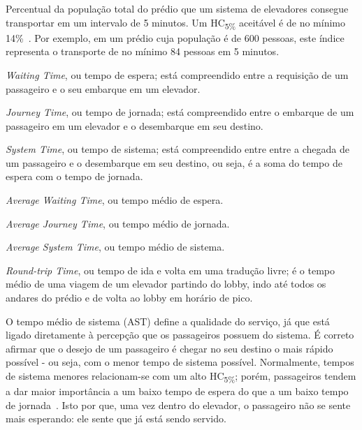 \begin{description}[leftmargin=!,labelwidth=\widthof{\bfseries HC\textsubscript{5\%}}]
  \item[HC\textsubscript{5\%}]
  Percentual da população total do prédio que um sistema de elevadores consegue transportar em um intervalo de 5 minutos. Um HC\textsubscript{5\%} aceitável é de no mínimo 14\%~\cite{KOEHLEROTTIGER02}. Por exemplo, em um prédio cuja população é de 600 pessoas, este índice representa o transporte de no mínimo 84 pessoas em 5 minutos.

  \item[WT]
  \textit{Waiting Time}, ou tempo de espera; está compreendido entre a requisição de um passageiro e o seu embarque em um elevador.

  \item[JT]
  \textit{Journey Time}, ou tempo de jornada; está compreendido entre o embarque de um passageiro em um elevador e o desembarque em seu destino.

  \item[ST]
  \textit{System Time}, ou tempo de sistema; está compreendido entre entre a chegada de um passageiro e o desembarque em seu destino, ou seja, é a soma do tempo de espera com o tempo de jornada.

  \item[AWT]
  \textit{Average Waiting Time}, ou tempo médio de espera.

  \item[AJT]
  \textit{Average Journey Time}, ou tempo médio de jornada.

  \item[AST]
  \textit{Average System Time}, ou tempo médio de sistema.

  \item[RTT]
  \textit{Round-trip Time}, ou tempo de ida e volta em uma tradução livre; é o tempo médio de uma viagem de um elevador partindo do lobby, indo até todos os andares do prédio e de volta ao lobby em horário de pico.
\end{description}

O tempo médio de sistema (AST) define a qualidade do serviço, já que está ligado diretamente à percepção que os passageiros possuem do sistema. É correto afirmar que o desejo de um passageiro é chegar no seu destino o mais rápido possível - ou seja, com o menor tempo de sistema possível. Normalmente, tempos de sistema menores relacionam-se com um alto HC\textsubscript{5\%}; porém, passageiros tendem a dar maior importância a um baixo tempo de espera do que a um baixo tempo de jornada~\cite{KOEHLEROTTIGER02}. Isto por que, uma vez dentro do elevador, o passageiro não se sente mais esperando: ele sente que já está sendo servido.

